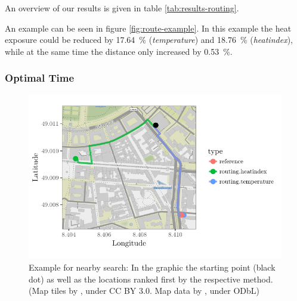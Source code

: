 An overview of our results is given in table \ref{tab:results-routing}.


An example can be seen in figure \ref{fig:route-example}. In this example the heat exposure could be reduced by \SI{17.64}{\percent} (\emph{temperature}) and \SI{18.76}{\percent} (\emph{heatindex}), while at the same time the distance only increased by  \SI{0.53}{\percent}.

\subsubsection{Optimal Time}

\begin{figure}
	\centering
	\includegraphics[scale=0.9]{figures/optimaltime_route_example}
	\caption{Example for nearby search: In the graphic the starting point (black dot) as well as the locations ranked first by the respective method. (Map tiles by \textcite{Stamen2017}, under CC BY 3.0. Map data by \textcite{OSMF2016}, under ODbL)}
	\label{fig:optimaltime-route-example}
\end{figure}

